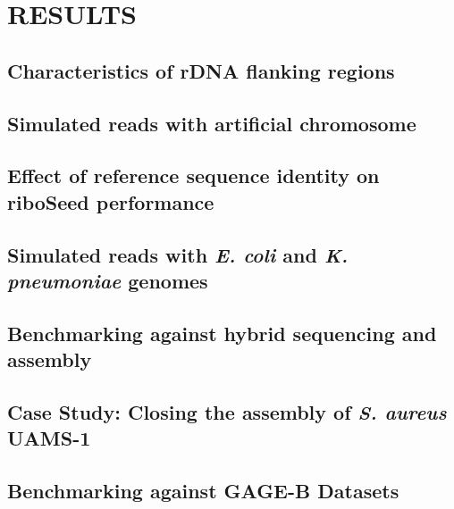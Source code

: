 \documentclass[a4,center,fleqn]{NAR}
\begin{document}
\section{RESULTS}

\subsection*{Characteristics of rDNA flanking regions}



\subsection*{Simulated reads with artificial chromosome}







\subsection*{Effect of reference sequence identity on riboSeed performance}






\subsection*{Simulated reads with \textit{E. coli} and \textit{K. pneumoniae} genomes}



\subsection*{Benchmarking against hybrid sequencing and assembly}




\subsection*{Case Study: Closing the assembly of \textit{S. aureus} UAMS-1}



\subsection*{Benchmarking against GAGE-B Datasets}
\end{document}
